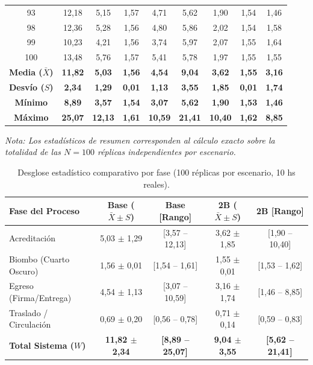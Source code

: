 \documentclass[11pt,a4paper]{article}
\begin{document}
\begin{table}[H]
\begin{tabular}{ccccccccc}
        93  & 12,18 & 5,15 & 1,57 & 4,71 & 5,62  & 1,90 & 1,54 & 1,46 \\
        98  & 12,36 & 5,28 & 1,56 & 4,80 & 5,86  & 2,02 & 1,54 & 1,58 \\
        99  & 10,23 & 4,21 & 1,56 & 3,74 & 5,97  & 2,07 & 1,55 & 1,64 \\
        100 & 13,48 & 5,76 & 1,57 & 5,41 & 5,78  & 1,97 & 1,55 & 1,55 \\
        \midrule
        \textbf{Media ($\bar{X}$)} & \textbf{11,82} & \textbf{5,03} & \textbf{1,56} & \textbf{4,54} & \textbf{9,04} & \textbf{3,62} & \textbf{1,55} & \textbf{3,16} \\
        \textbf{Desvío ($S$)}      & \textbf{2,34}  & \textbf{1,29} & \textbf{0,01} & \textbf{1,13} & \textbf{3,55} & \textbf{1,85} & \textbf{0,01} & \textbf{1,74} \\
        \textbf{Mínimo}            & \textbf{8,89}  & \textbf{3,57} & \textbf{1,54} & \textbf{3,07} & \textbf{5,62} & \textbf{1,90} & \textbf{1,53} & \textbf{1,46} \\
        \textbf{Máximo}            & \textbf{25,07} & \textbf{12,13} & \textbf{1,61} & \textbf{10,59} & \textbf{21,41} & \textbf{10,40} & \textbf{1,62} & \textbf{8,85} \\
        \bottomrule
    \end{tabular}
    \vspace{0.1cm}
    \flushleft \tiny \textit{Nota: Los estadísticos de resumen corresponden al cálculo exacto sobre la totalidad de las $N=100$ réplicas independientes por escenario.}
\end{table}

\begin{table}[H] 
    \centering 
    \small
    \setlength{\tabcolsep}{4.5pt}
    \caption{Desglose estadístico comparativo por fase (100 réplicas por escenario, 10 hs reales).} 
    \label{tab:tiempos_fases} 
    \begin{tabularx}{\textwidth}{Xcccc} 
        \toprule 
        \textbf{Fase del Proceso} & \textbf{Base ($\bar{X} \pm S$)} & \textbf{Base [Rango]} & \textbf{2B ($\bar{X} \pm S$)} & \textbf{2B [Rango]} \\ 
        \midrule 
        Acreditación             & 5,03 $\pm$ 1,29 & [3,57 -- 12,13] & 3,62 $\pm$ 1,85 & [1,90 -- 10,40] \\ 
        Biombo (Cuarto Oscuro)   & 1,56 $\pm$ 0,01 & [1,54 -- 1,61]  & 1,55 $\pm$ 0,01 & [1,53 -- 1,62] \\ 
        Egreso (Firma/Entrega)   & 4,54 $\pm$ 1,13 & [3,07 -- 10,59] & 3,16 $\pm$ 1,74 & [1,46 -- 8,85] \\ 
        Traslado / Circulación   & 0,69 $\pm$ 0,20 & [0,56 -- 0,78]  & 0,71 $\pm$ 0,14 & [0,59 -- 0,83]  \\
        \midrule
        \textbf{Total Sistema ($W$)} & \textbf{11,82 $\pm$ 2,34} & \textbf{[8,89 -- 25,07]} & \textbf{9,04 $\pm$ 3,55} & \textbf{[5,62 -- 21,41]} \\ 
        \bottomrule 
    \end{tabularx} 
\end{table}
\end{document}
